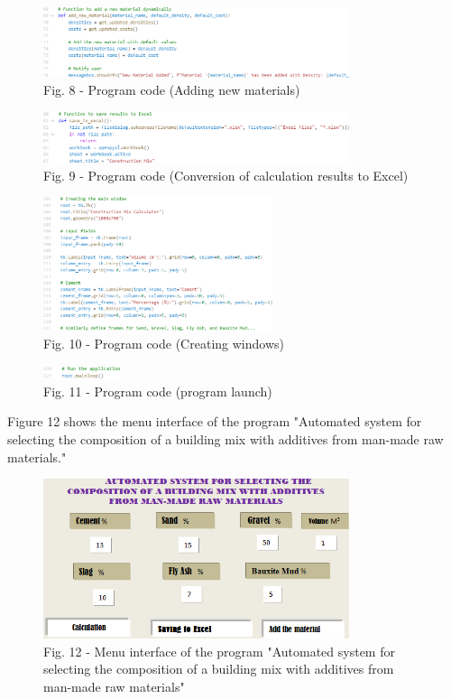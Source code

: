 \begin{figure}[H]
	\includegraphics[width=0.8\textwidth]{media/ict3/image9}
	\caption*{Fig. 8 - Program code (Adding new materials)}
\end{figure}

\begin{figure}[H]
	\includegraphics[width=0.8\textwidth]{media/ict3/image10}
	\caption*{Fig. 9 - Program code (Conversion of calculation results to Excel)}
\end{figure}

\begin{figure}[H]
	\includegraphics[width=0.6\textwidth]{media/ict3/image11}
	\caption*{Fig. 10 - Program code (Creating windows)}
\end{figure}

\begin{figure}[H]
	\includegraphics[width=0.2\textwidth]{media/ict3/image12}
	\caption*{Fig. 11 - Program code (program launch)}
\end{figure}

Figure 12 shows the menu interface of the program "Automated system for
selecting the composition of a building mix with additives from man-made
raw materials."

\begin{figure}[H]
	\centering
	\includegraphics[width=0.8\textwidth]{media/ict3/image13}
	\caption*{Fig. 12 - Menu interface of the program "Automated system for selecting the composition of a building mix with additives from man-made raw materials"}
\end{figure}


